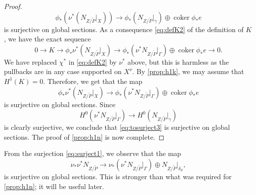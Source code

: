 \documentclass[11 pt]{amsart}
\providecommand{\coker}{\operatorname{coker}}
\numberwithin{equation}{section}
\begin{document}
\begin{proof}
\begin{equation}
    \phi_* \left(\nu^* \left(N_{Z/\widetilde{P}}\big|_X\right)\right) \to \phi_*\left(N_{Z/\widetilde{P}} \big|_\gamma\right) \oplus \coker \phi_*e
  \end{equation}
  is surjective on global sections.
  As a consequence \eqref{eq:defK2} of the definition of $K$, we have the exact sequence
  \[ 0 \to K \to \phi_* \nu^* \left(N_{Z/\widetilde{P}}\big|_X\right) \to \phi_*\left(\nu^*N_{Z/\widetilde{P}} \big|_\Gamma\right)\oplus \coker \phi_*e \to 0.\]
  We have replaced $\chi^*$ in \eqref{eq:defK2} by $\nu^*$ above, but this is harmless as the pullbacks are in any case supported on $X^\nu$.
  By \autoref{prop:h1k}, we may assume that $H^1(K) = 0$.
  Therefore, we get that the map
  \begin{equation}\label{eq:surject1}
    \phi_* \nu^* \left(N_{Z/\widetilde{P}}\big|_X\right)\to \phi_*\left(\nu^*N_{Z/\widetilde{P}} \big|_\Gamma\right) \oplus \coker \phi_*e
  \end{equation}
  is surjective on global sections.
  Since
  \[ H^0\left(\nu^*N_{Z/\widetilde{P}} \big|_\Gamma\right) \to H^0\left(N_{Z/\widetilde{P}} \big|_\gamma\right)\]
  is clearly surjective, we conclude that \eqref{eq:tosurject3} is surjective on global sections.
  The proof of \autoref{prop:h1n} is now complete.
\end{proof}
\begin{remark}\label{rem:surjgamma}
  From the surjection \eqref{eq:surject1}, we observe that the map
  \[\nu_* \nu^* N_{Z/\widetilde{P}} \to \nu_*\left(\nu^* N_{Z/\widetilde{P}}\big|_\Gamma \right)\oplus N_{Z/\widetilde{P}}\big|_{\delta_S},\]
  is surjective on global sections.
  This is stronger than what was required for \autoref{prop:h1n}; it will be useful later.
\end{remark}
\end{document}
